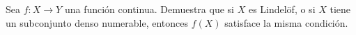 
  \item Sea $f: X \to Y$ una función continua. Demuestra que si $X$ es Lindelöf, o si $X$ tiene un subconjunto denso numerable, entonces $f(X)$ satisface la misma condición.
